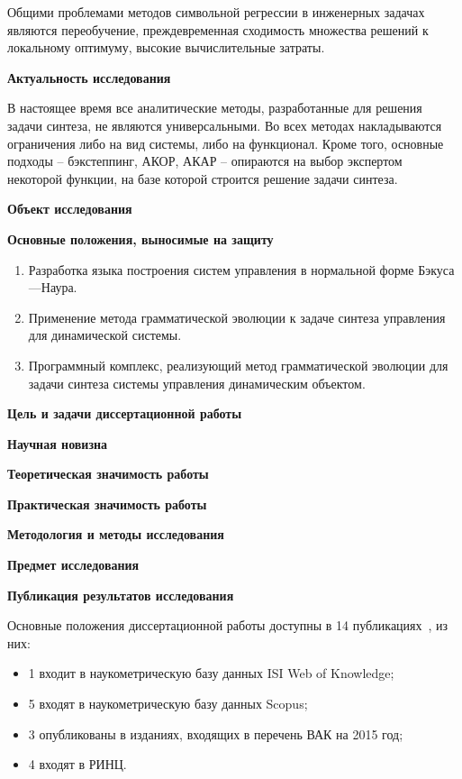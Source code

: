 Общими проблемами методов символьной регрессии в инженерных задачах являются переобучение, преждевременная сходимость множества решений к локальному оптимуму, высокие вычислительные затраты.

\textbf{Актуальность исследования}

В настоящее время все аналитические методы, разработанные для решения задачи синтеза, не являются универсальными. Во всех методах накладываются ограничения либо на вид системы, либо на функционал. Кроме того, основные подходы -- бэкстеппинг, АКОР, АКАР -- опираются на выбор экспертом некоторой функции, на базе которой строится решение задачи синтеза.

\textbf{Объект исследования}

\textbf{Основные положения, выносимые на защиту}

\begin{enumerate}
    \item Разработка языка построения систем управления в нормальной форме Бэкуса---Наура.
    \item Применение метода грамматической эволюции к задаче синтеза управления для динамической системы.
    \item Программный комплекс, реализующий метод грамматической эволюции для задачи синтеза системы управления динамическим объектом.
\end{enumerate}

\textbf{Цель и задачи диссертационной работы}

\textbf{Научная новизна}

\textbf{Теоретическая значимость работы}

\textbf{Практическая значимость работы}

\textbf{Методология и методы исследования}

\textbf{Предмет исследования}

\textbf{Публикация результатов исследования}

Основные положения диссертационной работы доступны в 14 публикациях~\cite{DanDiKaSo2015,DivKazSof2014,DivKazSof2013,DivKazSof2013a,ДанДиКаСо2014,ДивееКаза2013,ДивееКаза2012,Казарян2013,Казарян2014,Казарян2014a,КазКулЖар2010,КазХамКоч2014,КулЖарКаз2010}, из них:
\begin{itemize}
    \item 1 входит в наукометрическую базу данных ISI Web of Knowledge;
    \item 5 входят в наукометрическую базу данных Scopus;
    \item 3 опубликованы в изданиях, входящих в перечень ВАК на 2015 год;
    \item 4 входят в РИНЦ.
\end{itemize}

